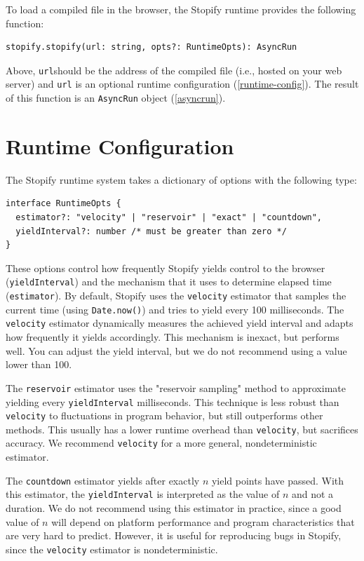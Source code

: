 \documentclass[10pt]{book}
\begin{document}
\lstset{language=js}
To load a compiled file in the browser, the Stopify runtime provides
the following function:
\begin{lstlisting}
stopify.stopify(url: string, opts?: RuntimeOpts): AsyncRun
\end{lstlisting}

Above, \lstinline|url|should be the address of the compiled file (i.e., hosted on
your web server) and \lstinline|url| is an optional runtime configuration
(\cref{runtime-config}). The result of this function is an \lstinline|AsyncRun|
object (\cref{asyncrun}).

\section{Runtime Configuration\label{runtime-config}}

The Stopify runtime system takes a dictionary of options with the
following type:

\lstset{language=js}
\begin{lstlisting}
interface RuntimeOpts {
  estimator?: "velocity" | "reservoir" | "exact" | "countdown",
  yieldInterval?: number /* must be greater than zero */
}
\end{lstlisting}

These options control how frequently Stopify yields control to the browser
(\lstinline|yieldInterval|) and the mechanism that it uses to determine
elapsed time (\lstinline|estimator|).
By default, Stopify uses the \texttt{velocity} estimator that samples the current
time (using \lstinline|Date.now()|) and tries to yield every 100 milliseconds.
The \texttt{velocity} estimator dynamically measures the achieved yield interval
and adapts how frequently it yields accordingly. This mechanism is inexact, but
performs well. You can adjust the yield interval, but we do not recommend using
a value lower than 100.

The \texttt{reservoir} estimator uses the "reservoir sampling" method to
approximate yielding every \texttt{yieldInterval} milliseconds. This technique
is less robust than \texttt{velocity} to fluctuations in program behavior, but
still outperforms other methods. This usually has a lower runtime overhead than
\texttt{velocity}, but sacrifices accuracy. We recommend \texttt{velocity} for a
more general, nondeterministic estimator.

The \texttt{countdown} estimator yields after exactly $n$
yield points have passed. With this estimator, the \texttt{yieldInterval}
is interpreted as the value of $n$ and not a duration. We do not recommend
using this estimator in practice, since a good value of $n$ will depend on
platform performance and program characteristics that are very hard to
predict. However, it is useful for reproducing bugs in Stopify, since
the \texttt{velocity} estimator is nondeterministic.
\end{document}
